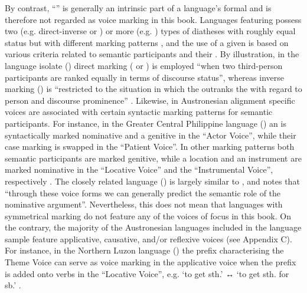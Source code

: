 By contrast, “” \citep[120ff.]{zuniga:kittila:2019} is generally an intrinsic part of a language’s formal  and is therefore not regarded as voice marking in this book. Languages featuring  possess two (e.g. direct-inverse or ) or more (e.g. ) types of diatheses with roughly equal status but with different marking patterns \citep[7]{arka:ross:2005}, and the use of a given  is based on various  criteria related to semantic participants and their . By illustration, in the language isolate  () direct marking ( or ) is employed “when two third-person participants are ranked equally in terms of discourse status”, whereas inverse marking () is “restricted to the situation in which the  outranks the  with regard to person and discourse prominence” \citep[265]{haude:2012}. Likewise, in Austronesian alignment specific voices are associated with certain syntactic marking patterns for semantic participants. For instance, in the Greater Central Philippine language  () an  is syntactically marked nominative and a  genitive in the “Actor Voice”, while their case marking is swapped in the “Patient Voice”. In other marking patterns both semantic participants are marked genitive, while a location and an instrument are marked nominative in the “Locative Voice” and the “Instrumental Voice”, respectively \citep[125ff.]{zuniga:kittila:2019}. The closely related language  () is largely similar to , and \citet[40]{tanangkingsing:2009} notes that “through these voice forms we can generally predict the semantic role of the nominative argument”. Nevertheless, this does not mean that languages with symmetrical marking do not feature any of the voices of focus in this book. On the contrary, the majority of the Austronesian languages included in the language sample feature applicative, causative, and/or reflexive voices (see Appendix C). For instance, in the Northern Luzon language  () the prefix  characterising the  Theme Voice can serve as voice marking in the applicative voice when the prefix is added onto verbs in the  “Locative Voice”, e.g.  ‘to get sth.’ ↔  ‘to get sth. for sb.’ \citep[157ff., 161ff.]{robinson:l:2011}.

